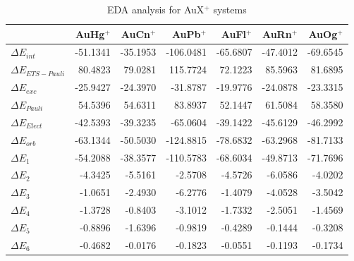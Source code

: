 \documentclass[journal=inoraj,manuscript=article]{achemso}
\begin{document}
\begin{table}[!h]
\begin{tabular}{lrrrrrr}
\hline
                       & AuHg$^+$ & AuCn$^+$ & AuPb$^+$  & AuFl$^+$ & AuRn$^+$ & AuOg$^+$ \\ \hline
\hline
$\Delta E_{int}$       & -51.1341 & -35.1953 & -106.0481 & -65.6807 & -47.4012 & -69.6545 \\ \hline
$\Delta E_{ETS-Pauli}$ &  80.4823 &  79.0281 &  115.7724 &  72.1223 &  85.5963 &  81.6895 \\ \hline
$\Delta E_{exc}$       & -25.9427 & -24.3970 &  -31.8787 & -19.9776 & -24.0878 & -23.3315 \\ \hline
$\Delta E_{Pauli}$     &  54.5396 &  54.6311 &   83.8937 &  52.1447 &  61.5084 &  58.3580 \\ \hline
$\Delta E_{Elect}$     & -42.5393 & -39.3235 &  -65.0604 & -39.1422 & -45.6129 & -46.2992 \\ \hline
$\Delta E_{orb}$       & -63.1344 & -50.5030 & -124.8815 & -78.6832 & -63.2968 & -81.7133 \\ \hline
$\Delta E_1$           & -54.2088 & -38.3577 & -110.5783 & -68.6034 & -49.8713 & -71.7696 \\ \hline
$\Delta E_2$           &  -4.3425 &  -5.5161 &   -2.5708 &  -4.5726 &  -6.0586 &  -4.0202 \\ \hline
$\Delta E_3$           &  -1.0651 &  -2.4930 &   -6.2776 &  -1.4079 &  -4.0528 &  -3.5042 \\ \hline
$\Delta E_4$           &  -1.3728 &  -0.8403 &   -3.1012 &  -1.7332 &  -2.5051 &  -1.4569 \\ \hline
$\Delta E_5$           &  -0.8896 &  -1.6396 &   -0.9819 &  -0.4289 &  -0.1444 &  -0.3208 \\ \hline
$\Delta E_6$           &  -0.4682 &  -0.0176 &   -0.1823 &  -0.0551 &  -0.1193 &  -0.1734 \\ \hline
\end{tabular}
\caption{EDA analysis for AuX$^+$ systems}
\end{table}
\end{document}
